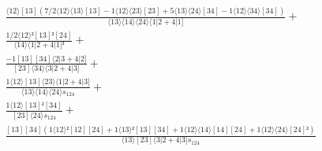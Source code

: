 \documentclass[varwidth, border=5pt]{standalone}
\begin{document}
\begin{my}
$\begin{gathered}
\scriptscriptstyle\frac{⟨12⟩[13](7/2⟨12⟩⟨13⟩[13]-1⟨12⟩⟨23⟩[23]+5⟨13⟩⟨24⟩[34]-1⟨12⟩⟨34⟩[34])}{⟨13⟩⟨14⟩⟨24⟩⟨1|2+4|1]} +\\
\scriptscriptstyle\frac{1/2⟨12⟩²[13]²[24]}{⟨14⟩⟨1|2+4|1]²} +\\
\scriptscriptstyle\frac{-1[13][34]⟨2|3+4|2]}{[23]⟨34⟩⟨3|2+4|3]} +\\
\scriptscriptstyle\frac{1⟨12⟩[13]⟨23⟩⟨1|2+4|3]}{⟨13⟩⟨14⟩⟨24⟩s_{124}} +\\
\scriptscriptstyle\frac{1⟨12⟩[13]²[34]}{[23]⟨24⟩s_{124}} +\\
\scriptscriptstyle\frac{[13][34](1⟨12⟩²[12][24]+1⟨13⟩²[13][34]+1⟨12⟩⟨14⟩[14][24]+1⟨12⟩⟨24⟩[24]²)}{⟨13⟩[23]⟨3|2+4|3]s_{124}} \phantom{+}
\end{gathered}$
\end{my}
\end{document}
